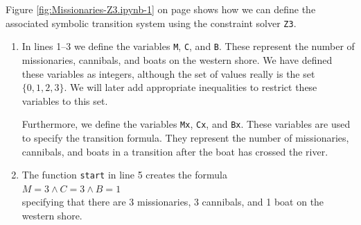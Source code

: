 Figure \ref{fig:Missionaries-Z3.ipynb-1} on page \pageref{fig:Missionaries-Z3.ipynb-1} shows how we can define
the associated symbolic transition system using the constraint solver \texttt{Z3}.
\begin{enumerate}
\item In lines 1--3 we define the variables \texttt{M}, \texttt{C}, and \texttt{B}.  These represent the
      number of missionaries, cannibals, and boats on the western shore.  We have defined these variables as
      integers, although the set of values really is the set $\{0,1,2,3\}$.  We will later add appropriate
      inequalities to restrict these variables to this set.

      Furthermore, we define the variables \texttt{Mx}, \texttt{Cx}, and \texttt{Bx}.  These variables are used
      to specify the transition formula.  They represent the
      number of missionaries, cannibals, and boats in a transition after the boat has crossed the river. 
\item The function \texttt{start} in line 5 creates the formula
      \\[0.2cm]
      \hspace*{1.3cm}
      $M = 3 \wedge C = 3 \wedge B = 1$
      \\[0.2cm]
      specifying that there are 3 missionaries, 3 cannibals, and 1 boat on the western shore.


\end{enumerate}
